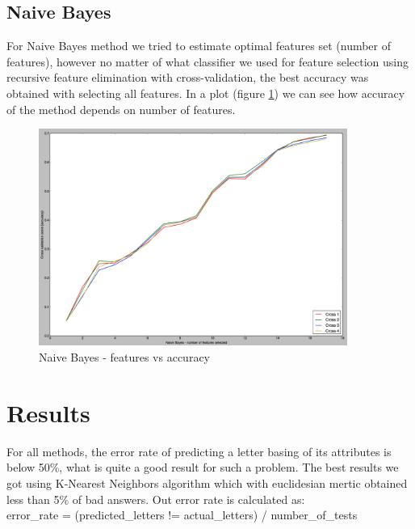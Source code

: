 \subsection{Naive Bayes}
For Naive Bayes method we tried to estimate optimal features set (number of features), however no matter of what
classifier we used for feature selection using recursive feature elimination with cross-validation, the best accuracy was
obtained with selecting all features. In a plot (figure \ref{fig:NB_feature_selection}) we can see how accuracy of the method 
depends on number of features.
\begin{figure}[!tbh]
	\centering
	\includegraphics[width=0.9\textwidth]{figures/NB_feature_selection}
	\caption{Naive Bayes - features vs accuracy}
	\label{fig:NB_feature_selection}
\end{figure}
\section{Results}
For all methods, the error rate of predicting a letter basing of its attributes is below 50\%, what is quite a good result for
such a problem. The best results we got using K-Nearest Neighbors algorithm which with euclidesian mertic obtained less
than 5\% of bad answers. Out error rate is calculated as: \\
error\_rate = (predicted\_letters != actual\_letters) / number\_of\_tests

